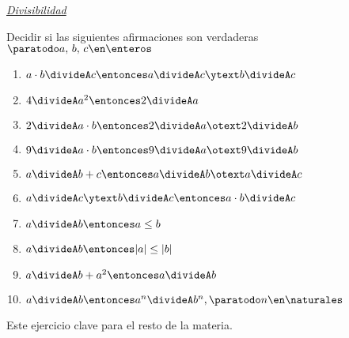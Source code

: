 \textit{\underline{Divisibilidad}}

\begin{enunciado}{\ejercicio}
  Decidir si las siguientes afirmaciones son verdaderas
  $\paratodo a,\, b,\, c \en \enteros$
  \begin{multicols}{2}
    \begin{enumerate}[label=\alph*)]
      \item $a \cdot b \divideA c \entonces a \divideA c  \ytext  b \divideA c$
      \item $4 \divideA a^2 \entonces 2 \divideA a $
      \item $2 \divideA a \cdot b \entonces 2 \divideA a  \otext 2 \divideA b$
      \item $9 \divideA a\cdot b \entonces 9 \divideA a   \otext  9 \divideA b$
      \item $a \divideA b + c \entonces a \divideA b  \otext  a \divideA c$
      \item $a \divideA c \ytext b \divideA c \entonces a \cdot b \divideA c$
      \item $a \divideA b \entonces a \leq b$
      \item $a \divideA b \entonces |a| \leq |b|$
      \item $a \divideA b + a^2 \entonces a \divideA b$
      \item $a \divideA b \entonces a^n \divideA b^n, \paratodo n \en \naturales$
    \end{enumerate}
  \end{multicols}
\end{enunciado}

Este ejercicio clave para el resto de la materia.

